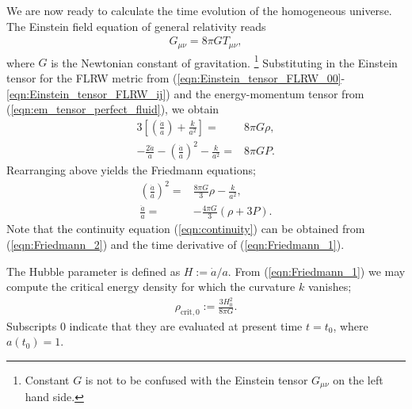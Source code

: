 We are now ready to calculate the time evolution of the homogeneous universe. The Einstein field equation of general relativity reads
\begin{align}
	G_{\mu\nu} = 8\pi G T_{\mu\nu},
\end{align}
where $G$ is the Newtonian constant of gravitation. \footnote{Constant $G$ is not to be confused with the Einstein tensor $G_{\mu\nu}$ on the left hand side.} Substituting in the Einstein tensor for the FLRW metric from (\ref{eqn:Einstein_tensor_FLRW_00}-\ref{eqn:Einstein_tensor_FLRW_ij}) and the energy-momentum tensor from (\ref{eqn:em_tensor_perfect_fluid}), we obtain
\begin{align}
	3 \left[ \left(\frac{\dot{a}}{a}\right) + \frac{k}{a^2} \right] =& 8\pi G \rho, \\
	-\frac{2\ddot{a}}{a} - \left(\frac{\dot{a}}{a}\right)^2 - \frac{k}{a^2} =& 8\pi G P.
\end{align}
Rearranging above yields the Friedmann equations;
\begin{align}
	\left(\frac{\dot{a}}{a}\right)^2 =& \frac{8\pi G}{3}\rho - \frac{k}{a^2}, \label{eqn:Friedmann_1}\\
	\frac{\ddot{a}}{a} =& - \frac{4\pi G}{3} \left(\rho + 3P\right). \label{eqn:Friedmann_2}
\end{align}
Note that the continuity equation (\ref{eqn:continuity}) can be obtained from (\ref{eqn:Friedmann_2}) and the time derivative of (\ref{eqn:Friedmann_1}).

The Hubble parameter is defined as $H := \dot{a}/a$. From (\ref{eqn:Friedmann_1}) we may compute the critical energy density for which the curvature $k$ vanishes;
\begin{align}
	\rho_{\text{crit},0} := \frac{3H_0^2}{8\pi G}.
\end{align}
Subscripts $0$ indicate that they are evaluated at present time $t=t_0$, where $a(t_0)=1$.

